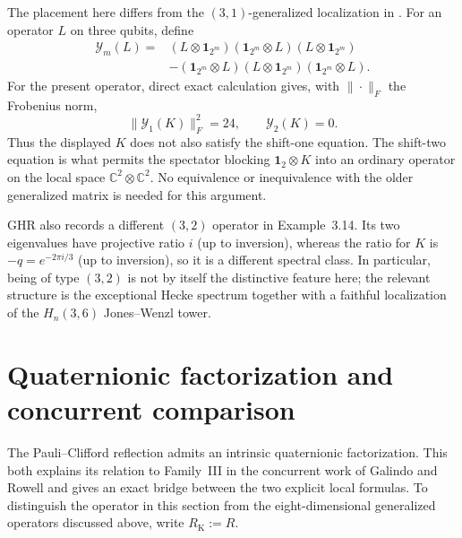 \documentclass[11pt]{article}
\theoremstyle{remark}
\newcommand{\Id}{\mathbf 1}
\newcommand{\bbC}{\mathbb C}
\begin{document}
The placement here differs from the \((3,1)\)-generalized localization in
\cite[Theorem~5.28 and Remark~5.29(1)]{GHR2013}.  For an
operator \(L\) on three qubits, define
\[
\begin{aligned}
  \mathcal Y_m(L)={}&
  (L\otimes\Id_{2^m})(\Id_{2^m}\otimes L)(L\otimes\Id_{2^m})\\
  &-(\Id_{2^m}\otimes L)(L\otimes\Id_{2^m})(\Id_{2^m}\otimes L).
\end{aligned}
\]
For the present operator, direct exact calculation gives, with
\(\|\cdot\|_F\) the Frobenius norm,
\[
  \|\mathcal Y_1(K)\|_F^2=24,\qquad \mathcal Y_2(K)=0.
\]
Thus the displayed \(K\) does not also satisfy the shift-one equation.
The shift-two equation is what permits the spectator blocking
\(\Id_2\otimes K\) into an ordinary operator on the local space
\(\bbC^2\otimes\bbC^2\).  No equivalence or inequivalence with the older
generalized matrix is needed for this argument.

GHR also records a different \((3,2)\) operator in Example~3.14.  Its two
eigenvalues have projective ratio \(i\) (up to inversion), whereas the ratio
for \(K\) is \(-q=e^{-2\pi i/3}\) (up to inversion), so it is a different
spectral class.  In particular, being of type \((3,2)\) is not by itself the
distinctive feature here; the relevant structure is the exceptional Hecke
spectrum together with a faithful localization of the \(H_n(3,6)\)
Jones--Wenzl tower.

\section{Quaternionic factorization and concurrent comparison}
\label{sec:quaternionic}

The Pauli--Clifford reflection admits an intrinsic quaternionic factorization.
This both explains its relation to Family~III in the concurrent work of
Galindo and Rowell and gives an exact bridge between the two explicit local
formulas.  To distinguish the operator in this section from the
eight-dimensional generalized operators discussed above, write
\(R_{\mathrm K}:=R\).
\end{document}
